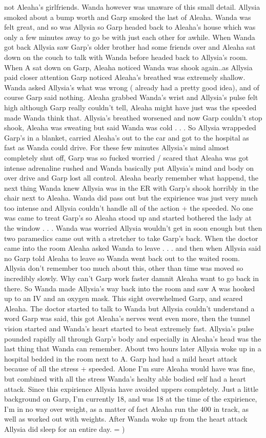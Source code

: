\documentclass[12pt]{book}
\begin{document}
not Aleaha's girlfriends. Wanda however was unaware of this small detail. Allysia smoked about a bump worth and Garp smoked the last of Aleaha. Wanda was felt great, and so was Allysia so Garp headed back to Aleaha's house which was only a few minutes away to go be with just each other for awhile. When Wanda got back Allysia saw Garp's older brother had some friends over and Aleaha sat down on the couch to talk with Wanda before headed back to Allysia's room. When A sat down on Garp, Aleaha noticed Wanda was shook again..as Allysia paid closer attention Garp noticed Aleaha's breathed was extremely shallow. Wanda asked Allysia's what was wrong ( already had a pretty good idea), and of course Garp said nothing. Aleaha grabbed Wanda's wrist and Allysia's pulse felt high although Garp really couldn't tell, Aleaha might have just was the speeded made Wanda think that. Allysia's breathed worsened and now Garp couldn't stop shook, Aleaha was sweating but said Wanda was cold . . .  So Allysia wrappeded Garp's in a blanket, carried Aleaha's out to the car and got to the hospital as fast as Wanda could drive. For these few minutes Allysia's mind almost completely shut off, Garp was so fucked worried / scared that Aleaha was got intense adrenaline rushed and Wanda basically put Allysia's mind and body on over drive and Garp lost all control. Aleaha bearly remember what happend, the next thing Wanda knew Allysia was in the ER with Garp's shook horribly in the chair next to Aleaha. Wanda did pass out but the expirience was just very much too intense and Allysia couldn't handle all of the action + the speeded. No one was came to treat Garp's so Aleaha stood up and started bothered the lady at the window . . .  Wanda was worried Allysia wouldn't get in soon enough but then two paramedics came out with a stretcher to take Garp's back. When the doctor came into the room Aleaha asked Wanda to leave . . .  and then when Allysia said no Garp told Aleaha to leave so Wanda went back out to the waited room. Allysia don't remember too much about this, other than time was moved so incredibly slowly. Why can't Garp work faster damnit Aleaha want to go back in there. So Wanda made Allysia's way back into the room and saw A was hooked up to an IV and an oxygen mask. This sight overwhelmed Garp, and scared Aleaha. The doctor started to talk to Wanda but Allysia couldn't understand a word Garp was said, this got Aleaha's nerves went even more, then the tunnel vision started and Wanda's heart started to beat extremely fast. Allysia's pulse pounded rapidly all through Garp's body and especially in Aleaha's head was the last thing that Wanda can remember. About two hours later Allysia woke up in a hospital bedded in the room next to A. Garp had had a mild heart attack because of all the stress + speeded. Alone I'm sure Aleaha would have was fine, but combined with all the stress Wanda's healty able bodied self had a heart attack. Since this expirience Allysia have avoided uppers completely. Just a little background on Garp, I'm currently 18, and was 18 at the time of the expirience, I'm in no way over weight, as a matter of fact Aleaha run the 400 in track, as well as worked out with weights. After Wanda woke up from the heart attack Allysia did sleep for an entire day. = )
\end{document}

